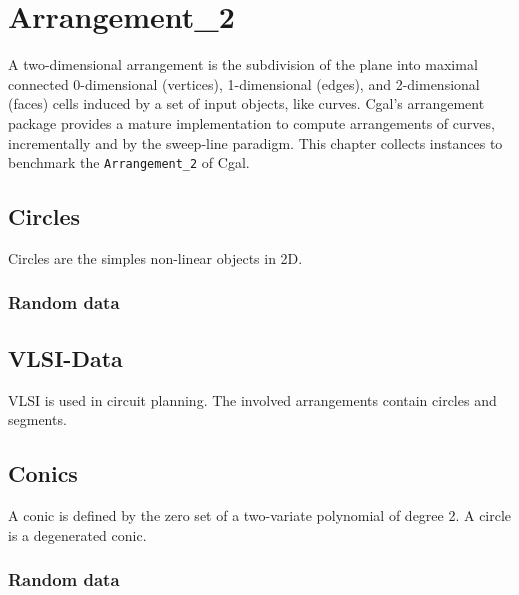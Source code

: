 \chapter{Arrangement\_2\label{bi_cha:Arrangement2}}

A two-dimensional arrangement is the subdivision of the plane into
maximal connected 0-dimensional (vertices), 1-dimensional (edges), 
and 2-dimensional (faces) cells induced by a set of input objects, like
curves. {\sc Cgal}'s arrangement package provides a mature implementation
to compute arrangements of curves, incrementally and by the sweep-line
paradigm. This chapter collects instances to benchmark the 
{\tt Arrangement\_2} of {\sc Cgal}.

\section{Circles\label{bi_sec:Arrangement2Circles}}

Circles are the simples non-linear objects in 2D. 

\subsection{Random data\label{bi_sec:Arrangement2CirclesRandomdata}}


\section{VLSI-Data\label{bi_sec:Arrangement2VLSI}}

VLSI is used in circuit planning. The involved arrangements contain
circles and segments.

\section{Conics\label{bi_sec:Arrangement2Conics}}

A conic is defined by the zero set of a two-variate polynomial
of degree 2. A circle is a degenerated conic.

\subsection{Random data\label{bi_sec:Arrangement2ConicsRandomdata}}
